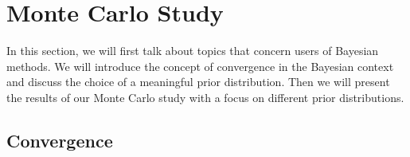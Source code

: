 \setlength{\abovedisplayskip}{2pt}
\setlength{\belowdisplayskip}{2pt}
\section{Monte Carlo Study}
\label{sec:monte_carlo}

In this section, we will first talk about topics that concern users of Bayesian methods. We will introduce the concept of convergence in the Bayesian context and discuss the choice of a meaningful prior distribution. Then we will present the results of our Monte Carlo study with a focus on different prior distributions.

\subsection{Convergence}

